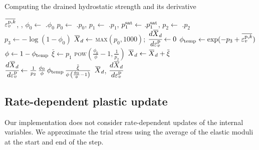 \begin{breakablealgorithm}
  \caption{Computing the drained hydrostatic strength and its derivative}
  \begin{algorithmic}[1]
    \Require $\bar{\Veps_v^{\Tp,k}}$, ,  
      \State $\phi_0 \leftarrow$ .$\phi_0$
      \State $p_0 \leftarrow$ .$p_0$,
             $p_1 \leftarrow$ .$p_1$,
             $p_1^{\text{sat}} \leftarrow$ .$p_1^{\text{sat}}$,
             $p_2 \leftarrow$ .$p_2$
      \State $p_3 \leftarrow - \log(1 - \phi_0)$ 
      \State $\Xbar_d \leftarrow$ \textsc{max}$(p_0, 1000)$;
      \State $\Deriv{\Xbar_d}{\Veps_v^\Tp} \leftarrow 0$
        \State $ \phi_\Temp \leftarrow \exp(-p_3 + \bar{\Veps_v^{\Tp,k}})$
        \State $ \phi \leftarrow 1 - \phi_{\text{temp}}$
        \State $ \bar{\xi} \leftarrow p_1$ \textsc{pow}$\left(\frac{\phi_0}{\phi} - 1, \frac{1}{p_2}\right)$
        \State $ \Xbar_d \leftarrow \Xbar_d + \bar{\xi}$
        \State $\Deriv{\Xbar_d}{\Veps_v^\Tp} \leftarrow 
          \frac{1}{p_2}\,\frac{\phi_0}{\phi}\,\phi_\Temp\,
          \frac{\bar{\xi}}{\phi\,\left(\frac{\phi_0}{\phi} - 1\right)}$
      \EndIf
      \State \Return $\Xbar_d$, $\Deriv{\Xbar_d}{\Veps_v^\Tp}$
    \EndProcedure
  \end{algorithmic}
\end{breakablealgorithm}

\subsection{Rate-dependent plastic update}

  Our implementation does not consider rate-dependent updates of the internal variables.
  We approximate the trial stress using the average of the elastic moduli at the start 
  and end of the step.

